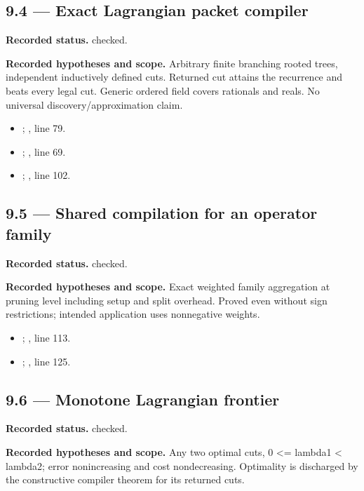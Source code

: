 \subsection{9.4 — Exact Lagrangian packet compiler}
\label{result:9.4}
\textbf{Recorded status.} checked.

\textbf{Recorded hypotheses and scope.} Arbitrary finite branching rooted trees, independent inductively defined cuts. Returned cut attains the recurrence and beats every legal cut. Generic ordered field covers rationals and reals. No universal discovery/approximation claim.

\begin{itemize}
\item {}; , line 79.
\item {}; , line 69.
\item {}; , line 102.
\end{itemize}
\subsection{9.5 — Shared compilation for an operator family}
\label{result:9.5}
\textbf{Recorded status.} checked.

\textbf{Recorded hypotheses and scope.} Exact weighted family aggregation at pruning level including setup and split overhead. Proved even without sign restrictions; intended application uses nonnegative weights.

\begin{itemize}
\item {}; , line 113.
\item {}; , line 125.
\end{itemize}
\subsection{9.6 — Monotone Lagrangian frontier}
\label{result:9.6}
\textbf{Recorded status.} checked.

\textbf{Recorded hypotheses and scope.} Any two optimal cuts, 0 <= lambda1 < lambda2; error nonincreasing and cost nondecreasing. Optimality is discharged by the constructive compiler theorem for its returned cuts.

